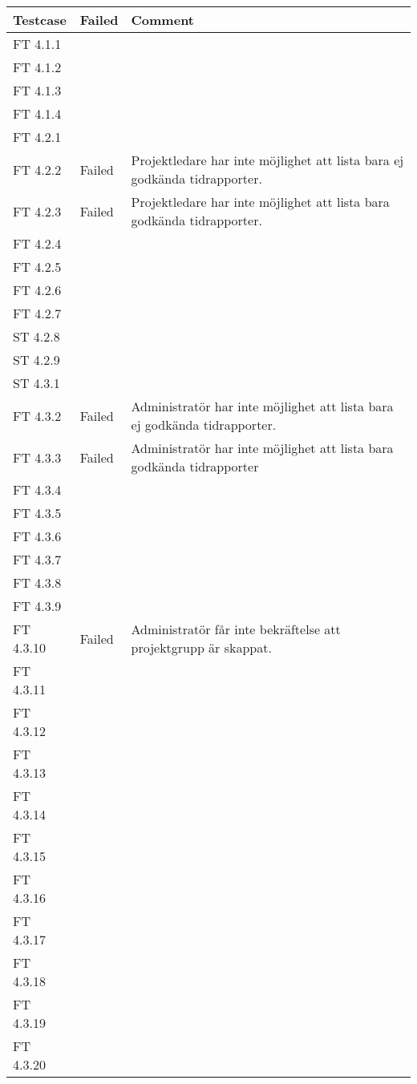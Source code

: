 \documentclass[a4paper]{article}
\begin{document}
\begin{tabular}{| l | l | p{11cm} |}
\hline
Testcase &  Failed & Comment\\
\hline
FT 4.1.1 & & \\
\hline
FT 4.1.2 & & \\
\hline
FT 4.1.3 & & \\
\hline
FT 4.1.4 & & \\
\hline
FT 4.2.1 & & \\
\hline
FT 4.2.2 & Failed & Projektledare har inte möjlighet att lista bara ej godkända tidrapporter.\\
\hline
FT 4.2.3 & Failed & Projektledare har inte möjlighet att lista bara godkända tidrapporter.\\
\hline
FT 4.2.4 & & \\
\hline
FT 4.2.5 & & \\
\hline
FT 4.2.6 & & \\
\hline
FT 4.2.7 & & \\
\hline
ST 4.2.8 & & \\
\hline
ST 4.2.9 & & \\
\hline
ST 4.3.1 & & \\
\hline
FT 4.3.2 & Failed & Administratör har inte möjlighet att lista bara ej godkända tidrapporter. \\
\hline
FT 4.3.3 & Failed & Administratör har inte möjlighet att lista bara godkända tidrapporter\\
\hline
FT 4.3.4 & & \\
\hline
FT 4.3.5 & & \\
\hline
FT 4.3.6 & & \\
\hline
FT 4.3.7 & & \\
\hline
FT 4.3.8 & & \\
\hline
FT 4.3.9 & & \\
\hline
FT 4.3.10 & Failed & Administratör får inte bekräftelse att projektgrupp är skappat. \\
\hline
FT 4.3.11 & & \\
\hline
FT 4.3.12 & & \\
\hline
FT 4.3.13 & & \\
\hline
FT 4.3.14 & & \\
\hline
FT 4.3.15 & & \\
\hline
FT 4.3.16 & & \\
\hline
FT 4.3.17 & & \\
\hline
FT 4.3.18 & & \\
\hline
FT 4.3.19 & & \\
\hline
FT 4.3.20 & & \\
\end{tabular}
\end{document}
